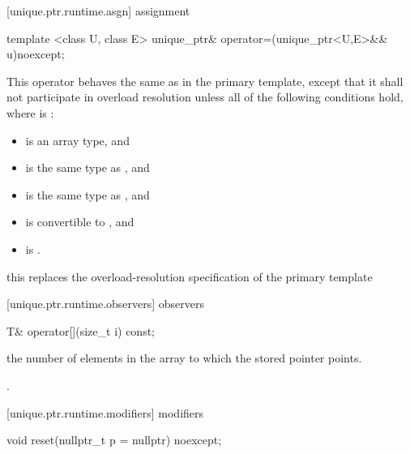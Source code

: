 [unique.ptr.runtime.asgn]{ assignment}

%
\begin{itemdecl}
template <class U, class E>
  unique_ptr& operator=(unique_ptr<U,E>&& u)noexcept;
\end{itemdecl}

\begin{itemdescr}
\pnum
This operator behaves the same as in the primary template,
except that it shall not participate in overload resolution
unless all of the following conditions hold,
where  is :

\begin{itemize}
\item {} is an array type, and
\item {} is the same type as , and
\item {} is the same type as , and
\item {} is convertible to , and
\item {} is .
\end{itemize}

\enternote
this replaces the overload-resolution specification of the primary template
\exitnote
\end{itemdescr}

[unique.ptr.runtime.observers]{ observers}

\begin{itemdecl}
T& operator[](size_t i) const;
\end{itemdecl}

\begin{itemdescr}
\pnum
\requires {} the
number of elements in the array to which
the stored pointer points.

\pnum
\returns {}.
\end{itemdescr}

[unique.ptr.runtime.modifiers]{ modifiers}

\begin{itemdecl}
void reset(nullptr_t p = nullptr) noexcept;
\end{itemdecl}

